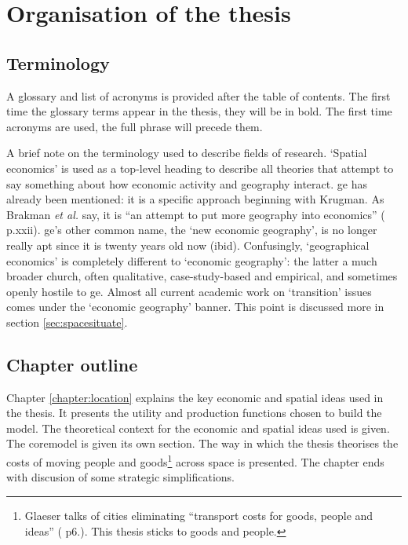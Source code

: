 \section{Organisation of the thesis \label{sec:org}}

\subsection{Terminology}

A glossary and list of acronyms is provided after the table of contents. The first time the glossary terms appear in the thesis, they will be in bold. The first time acronyms are used, the full phrase will precede them.

A brief note on the terminology used to describe fields of research. `Spatial economics' is used as a top-level heading to describe all theories that attempt to say something about how economic activity and geography interact. \gls{ge} has already been mentioned: it is a specific approach beginning with Krugman. As Brakman \emph{et al.} say, it is ``an attempt to put more geography into economics'' (\citealt{brakman_introduction_2011} p.xxii). \gls{ge}'s other common name, the `new economic geography', is no longer really apt since it is twenty years old now (ibid). Confusingly, `geographical economics' is completely different to `economic geography': the latter a much broader church, often qualitative, case-study-based and empirical, and sometimes openly hostile to \gls{ge}. Almost all current academic work on `transition' issues comes under the `economic geography' banner. This point is discussed more in section \ref{sec:spacesituate}.

\subsection{Chapter outline}

Chapter \ref{chapter:location} explains the key economic and spatial ideas used in the thesis. It presents the utility and production functions chosen to build the model. The theoretical context for the economic and spatial ideas used is given. The \gls{coremodel} is given its own section. The way in which the thesis theorises the costs of moving people and goods\footnote{Glaeser talks of cities eliminating ``transport costs for goods, people and ideas'' (\citealt{glaeser_cities_2008} p6.). This thesis sticks to goods and people.} across space is presented. The chapter ends with discusion of some strategic simplifications.

